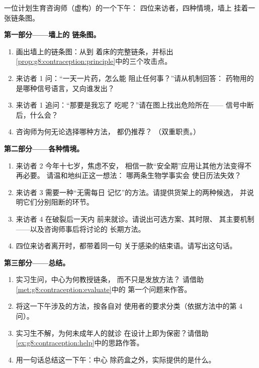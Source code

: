 \begin{problem}\label{pb:g8:contraception:1}
一位计划生育咨询师（虚构）的一个下午：
四位来访者，四种情境，墙上
挂着一张链条图。

\medskip\noindent\textbf{第一部分——墙上的
链条图。}
\begin{enumerate}
  \item 画出墙上的链条图：从到
        着床的完整链条，并标出
        \cref{prop:g8:contraception:principle}中的三个攻击点。
  \item 来访者 1 问：“一天一片药，怎么能
        阻止任何事？”请从机制回答：
        药物用的是哪种信号语言，又向谁发出？
  \item 来访者 1 追问：“那要是我忘了
        吃呢？”请在图上找出危险所在——
        信号中断后，什么会？
  \item 咨询师为何无论选择哪种方法，
        都仍推荐？
        （双重职责。）
\end{enumerate}

\medskip\noindent\textbf{第二部分——各种情境。}
\begin{enumerate}[resume]
  \item 来访者 2 今年十七岁，焦虑不安，
        相信一款“安全期”应用让其他方法变得不再必要。
        请温和地纠正这一想法：
        哪两条生物学事实会
        使日历法失效？
  \item 来访者 3 需要一种“无需每日
        记忆”的方法。请提供货架上的两种候选，
        并说明它们分别阻断的环节。
  \item 来访者 4 在破裂后一天内
        前来就诊。请说出可选方案、其时限、
        其主要机制——以及咨询师事后将讨论的
        长期方法。
  \item 四位来访者离开时，都带着同一句
        关于感染的结束语。请写出这句话。
\end{enumerate}

\medskip\noindent\textbf{第三部分——总结。}
\begin{enumerate}[resume]
  \item 实习生问，中心为何教授链条，
        而不只是发放方法？
        请借助
        \cref{met:g8:contraception:evaluate}中的
        第一个问题来作答。
  \item 将这一下午涉及的方法，按各自对
        使用者的要求分类（依据方法中的第 4 问）。
  \item 实习生不解，为何未成年人的就诊
        在设计上即为保密？请借助
        \cref{ex:g8:contraception:help}中的思路作答。
  \item 用一句话总结这一下午：中心
        除药盒之外，实际提供的是什么。
\end{enumerate}
\end{problem}
